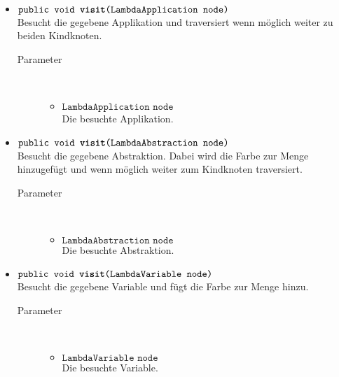 \begin{description}
\begin{itemize}
		\item $\texttt{public void \textbf{visit}(LambdaApplication node)}$ \\ Besucht die gegebene Applikation und traversiert wenn möglich weiter zu beiden Kindknoten.
		\begin{description}
			\item[Parameter] \hfill \\
			\vspace{-.8cm}
			\begin{itemize}
				\item $\texttt{LambdaApplication node}$ \\ Die besuchte Applikation.
			\end{itemize}
		\end{description}
		
		\item $\texttt{public void \textbf{visit}(LambdaAbstraction node)}$ \\ Besucht die gegebene Abstraktion. Dabei wird die Farbe zur Menge hinzugefügt und wenn möglich weiter zum Kindknoten traversiert.
		\begin{description}
			\item[Parameter] \hfill \\
			\vspace{-.8cm}
			\begin{itemize}
				\item $\texttt{LambdaAbstraction node}$ \\ Die besuchte Abstraktion.
			\end{itemize}
		\end{description}
		
		\item $\texttt{public void \textbf{visit}(LambdaVariable node)}$ \\ Besucht die gegebene Variable und fügt die Farbe zur Menge hinzu.
		\begin{description}
			\item[Parameter] \hfill \\
			\vspace{-.8cm}
			\begin{itemize}
				\item $\texttt{LambdaVariable node}$ \\ Die besuchte Variable.
			\end{itemize}
		\end{description}
		

\end{itemize}
\end{description}
